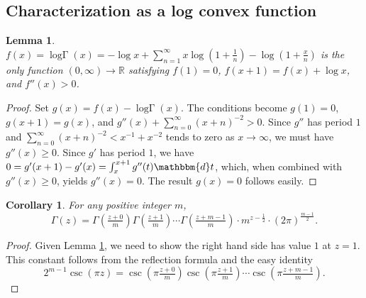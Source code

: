 \documentclass[12pt]{article}
\newcommand{\logG} {\operatorname {log \Gamma}}
\newcommand{\bbR}[0]  { \mathbb{R}}
\newcommand{\dd}[0] {\mathbbm{d}}
\numberwithin{equation}{section}
\newtheorem{lemma}[theorem]{Lemma}
\newtheorem{corollary}[theorem]{Corollary}
\begin{document}
\subsection{Characterization as a log convex function}
\begin{lemma}
\label{lemma_loggamma_char}
$f(x) = \logG (x) = -\log x + \sum_{n=1}^{\infty} x \log(1+\frac{1}{n}) - \log(1+\frac{x}{n})$ is the only function $(0,\infty) \to \bbR$ satisfying $f(1) = 0$, $f(x+1) = f(x) + \log x$, and $f''(x) > 0$.
\end{lemma}
\begin{proof}
Set $g(x) = f(x) - \logG (x)$. The conditions become $g(1) = 0$, $g(x+1) = g(x)$, and $
g''(x) + \sum_{n=0}^{\infty} (x+n)^{-2} > 0$.
Since $g''$ has period $1$ and $\sum_{n=0}^{\infty} (x+n)^{-2} < x^{-1} + x^{-2}$ tends to zero as $x \to \infty$, we must have $g''(x) \ge 0$. Since $g'$ has period $1$, we have $0 = g'(x+1) - g'(x) = \int_{x}^{x+1} g''(t) \dd t$,
which, when combined with $g''(x) \ge 0$, yields $g''(x) = 0$. The result $g(x)=0$ follows easily.
\end{proof}

\begin{corollary}
For any positive integer $m$,
\begin{equation*}
\Gamma(z) = \Gamma(\tfrac{z+0}{m})\Gamma(\tfrac{z+1}{m})\cdots \Gamma(\tfrac{z+m-1}{m}) \cdot m^{z-\frac{1}{2}} \cdot (2\pi)^{\frac{m-1}{2}}\text{.}
\end{equation*}
\end{corollary}
\begin{proof}
Given Lemma \ref{lemma_loggamma_char}, we need to show the right hand side has value $1$ at $z=1$. This constant follows from the reflection formula and the easy identity
\begin{equation*}
2^{m-1} \csc(\pi z) = \csc(\pi \tfrac{z+0}{m})\csc(\pi \tfrac{z+1}{m}) \cdots \csc(\pi \tfrac{z+m-1}{m})\text{.}
\end{equation*}
\end{proof}
\end{document}
